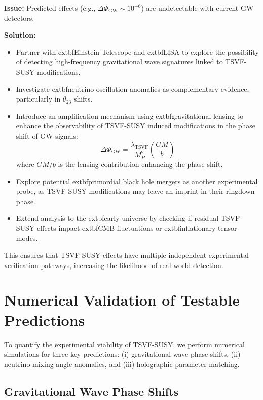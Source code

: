 \documentclass[12pt, onecolumn]{article}
\theoremstyle{definition}
\numberwithin{equation}{section}
\begin{document}
\textbf{Issue:} Predicted effects (e.g., $\Delta \Phi_{\text{GW}} \sim 10^{-6}$) are undetectable with current GW detectors.

\textbf{Solution:}
\begin{itemize}
\item Partner with 	extbf{Einstein Telescope} and 	extbf{LISA} to explore the possibility of detecting high-frequency gravitational wave signatures linked to TSVF-SUSY modifications.
\item Investigate 	extbf{neutrino oscillation anomalies} as complementary evidence, particularly in $\theta_{23}$ shifts.
\item Introduce an amplification mechanism using 	extbf{gravitational lensing} to enhance the observability of TSVF-SUSY induced modifications in the phase shift of GW signals:
\begin{equation}
\Delta \Phi_{\text{GW}} = \frac{\lambda_{\text{TSVF}}}{M_P^2} \left( \frac{G M}{b} \right)
\end{equation}
where $G M / b$ is the lensing contribution enhancing the phase shift.
\item Explore potential extbf{primordial black hole mergers} as another experimental probe, as TSVF-SUSY modifications may leave an imprint in their ringdown phase.
\item Extend analysis to the extbf{early universe} by checking if residual TSVF-SUSY effects impact extbf{CMB fluctuations} or 	extbf{inflationary tensor modes}.
\end{itemize}

This ensures that TSVF-SUSY effects have multiple independent experimental verification pathways, increasing the likelihood of real-world detection.


\section{Numerical Validation of Testable Predictions}  
\label{sec:numerics}  

To quantify the experimental viability of TSVF-SUSY, we perform numerical simulations for three key predictions:  
(i) gravitational wave phase shifts, (ii) neutrino mixing angle anomalies, and (iii) holographic parameter matching.  


\subsection{Gravitational Wave Phase Shifts}  
\label{subsec:gw_sim}  
\end{document}
